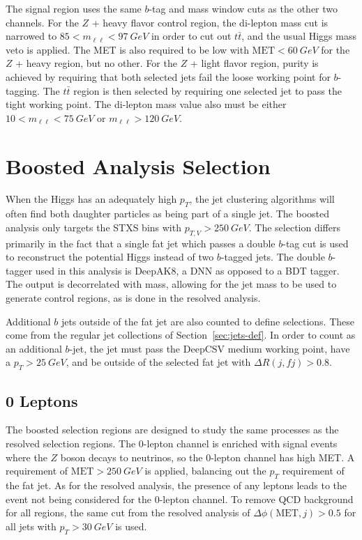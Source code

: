 The signal region uses the same $b$-tag and mass window cuts as the other two channels.
For the $Z$ + heavy flavor control region,
the di-lepton mass cut is narrowed to $85 < m_{\ell\ell} < \SI{97}{GeV}$
in order to cut out $t\bar{t}$, and the usual Higgs mass veto is applied.
The MET is also required to be low with $\mathrm{MET} < \SI{60}{GeV}$
for the $Z$ + heavy region, but no other.
For the $Z$ + light flavor region, purity is achieved by requiring
that both selected jets fail the loose working point for $b$-tagging.
The $t\bar{t}$ region is then selected by requiring
one selected jet to pass the tight working point.
The di-lepton mass value also must be either $10 < m_{\ell\ell} < \SI{75}{GeV}$
or $m_{\ell\ell} > \SI{120}{GeV}$.

\section{Boosted Analysis Selection}

When the Higgs has an adequately high $p_T$,
the jet clustering algorithms will often find both daughter particles
as being part of a single jet.
The boosted analysis only targets the STXS bins with $p_{T,V} > \SI{250}{GeV}$.
The selection differs primarily in the fact that a single fat jet
which passes a double $b$-tag cut \cite{Sirunyan_2018}
is used to reconstruct the potential Higgs instead of two $b$-tagged jets.
The double $b$-tagger used in this analysis is DeepAK8,
a DNN as opposed to a BDT tagger.
The output is decorrelated with mass, allowing for the jet mass to be used
to generate control regions, as is done in the resolved analysis.

Additional $b$ jets outside of the fat jet are also counted to define selections.
These come from the regular jet collections of Section~\ref{sec:jets-def}.
In order to count as an additional $b$-jet,
the jet must pass the DeepCSV medium working point,
have a $p_T > \SI{25}{GeV}$, and be outside of the selected fat jet
with $\Delta R(j, f\!j) > 0.8$.

\subsection{0 Leptons}

The boosted selection regions are designed to study the same processes
as the resolved selection regions.
The 0-lepton channel is enriched with signal events where
the $Z$ boson decays to neutrinos, so the 0-lepton channel has high MET.
A requirement of $\mathrm{MET} > \SI{250}{GeV}$ is applied,
balancing out the $p_T$ requirement of the fat jet.
As for the resolved analysis, the presence of any leptons leads to
the event not being considered for the 0-lepton channel.
To remove QCD background for all regions, the same cut from the resolved analysis of
$\Delta \phi(\mathrm{MET}, j) > 0.5$ for all jets with $p_T > \SI{30}{GeV}$ is used.

